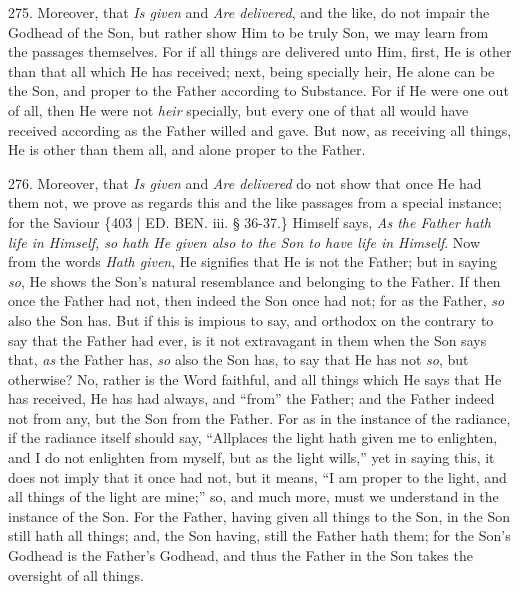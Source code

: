 275.
Moreover, that \emph{Is given} and \emph{Are delivered}, and the like,
do not impair the Godhead of the Son, but rather show Him to be truly
Son, we may learn from the passages themselves. For if all things are
delivered unto Him, first, He is other than that all which He has
received; next, being specially heir, He alone can be the Son, and
proper to the Father according to Substance. For if He were one out of
all, then He were not \emph{heir} specially, but every one of that all
would have received according as the Father willed and gave. But now,
as receiving all things, He is other than them all, and alone proper
to the Father.

276.
Moreover, that \emph{Is given} and \emph{Are delivered} do not show
that once He had them not, we prove as regards this and the like
passages from a special instance; for the Saviour \{403 | ED. BEN.
iii. § 36-37.\} Himself says, \emph{As the Father hath life in Himself,
so hath He given also to the Son to have life in Himself}. Now from
the words \emph{Hath given}, He signifies that He is not the Father;
but in saying \emph{so}, He shows the Son's natural resemblance and
belonging to the Father. If then once the Father had not, then indeed
the Son once had not; for as the Father, \emph{so} also the Son has.
But if this is impious to say, and orthodox on the contrary to say
that the Father had ever, is it not extravagant in them when the Son
says that, \emph{as} the Father has, \emph{so} also the Son has, to
say that He has not \emph{so}, but otherwise? No, rather is the Word
faithful, and all things which He says that He has received, He has
had always, and ``from'' the Father; and the Father indeed not from any,
but the Son from the Father. For as in the instance of the radiance,
if the radiance itself should say, ``All\emph{}places the light hath
given me to enlighten, and I do not enlighten from myself, but as the
light wills,'' yet in saying this, it does not imply that it once had
not, but it means, ``I am proper to the light, and all things of the
light are mine;'' so, and much more, must we understand in the instance
of the Son. For the Father, having given all things to the Son, in the
Son still hath all things; and, the Son having, still the Father hath
them; for the Son's Godhead is the Father's Godhead, and thus the
Father in the Son takes the oversight of all things.

